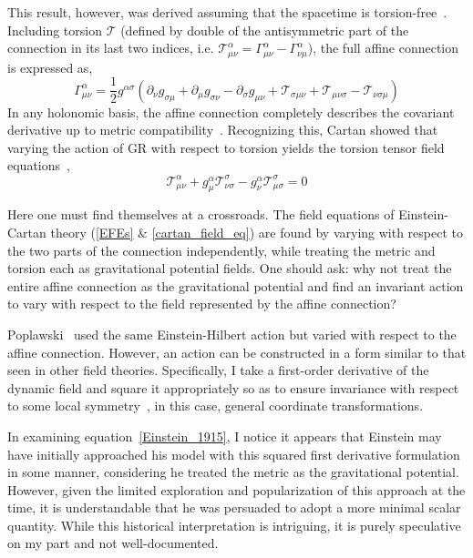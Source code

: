 \documentclass[aps,prd,preprint]{revtex4-1}
\begin{document}
This result, however, was derived assuming that the spacetime is torsion-free~\cite{Einstein_1915,Einstein_1916,misner_2017,watanabe_2004}. Including torsion $\mathcal{T}$ (defined by double of the antisymmetric part of the connection in its last two indices, i.e. $\mathcal{T}^{\alpha}_{\mu\nu}=\Gamma^{\alpha}_{\mu\nu} - \Gamma^{\alpha}_{\nu\mu}$), the full affine connection is expressed as,
\begin{equation}\label{affine_connection}
    \Gamma^{\alpha}_{\mu\nu}=\frac{1}{2}g^{\alpha\sigma}(\partial_{\nu}g_{\sigma\mu}+\partial_{\mu}g_{\sigma\nu}-\partial_{\sigma}g_{\mu\nu} + \mathcal{T}_{\sigma\mu\nu}+\mathcal{T}_{\mu\nu\sigma}-\mathcal{T}_{\nu\sigma\mu})
\end{equation}
In any holonomic basis, the affine connection completely describes the covariant derivative up to metric compatibility~\cite{misner_2017}. Recognizing this, Cartan showed that varying the action of GR with respect to torsion yields the torsion tensor field equations~\cite{cartan_1922},
\begin{equation}\label{cartan_field_eq}
    \mathcal{T}^{\alpha}_{\mu\nu} + g^{\alpha}_{\mu}\mathcal{T}^{\sigma}_{\nu\sigma} - g^{\alpha}_{\nu}\mathcal{T}^{\sigma}_{\mu\sigma} = 0
\end{equation}

Here one must find themselves at a crossroads. The field equations of Einstein-Cartan theory (\ref{EFEs} \& \ref{cartan_field_eq}) are found by varying with respect to the two parts of the connection independently, while treating the metric and torsion each as gravitational potential fields. One should ask: why not treat the entire affine connection as the gravitational potential and find an invariant action to vary with respect to the field represented by the affine connection?

Poplawski~\cite{poplawski_2014} used the same Einstein-Hilbert action but varied with respect to the affine connection. However, an action can be constructed in a form similar to that seen in other field theories. Specifically, I take a first-order derivative of the dynamic field and square it appropriately so as to ensure invariance with respect to some local symmetry~\cite{peskin_1995,weinberg_1995}, in this case, general coordinate transformations.

In examining equation~\eqref{Einstein_1915}, I notice it appears that Einstein may have initially approached his model with this squared first derivative formulation in some manner, considering he treated the metric as the gravitational potential. However, given the limited exploration and popularization of this approach at the time, it is understandable that he was persuaded to adopt a more minimal scalar quantity. While this historical interpretation is intriguing, it is purely speculative on my part and not well-documented.
\end{document}
